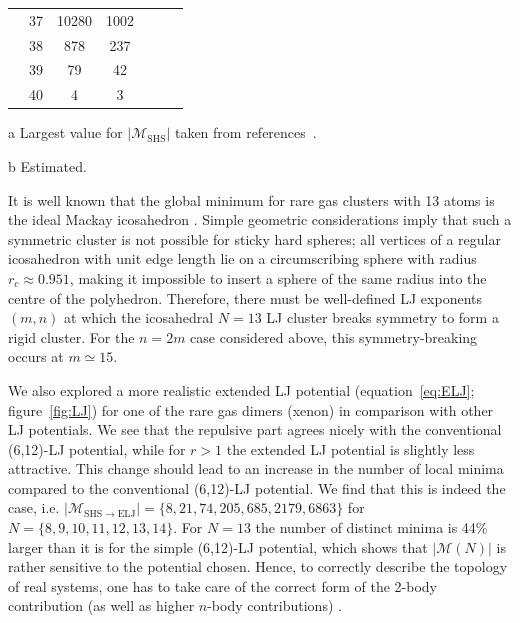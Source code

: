 \begin{table}[htbp]
{\begin{threeparttable}[para]
\begin{tabular}{clccccc}
   & 37  & 10280  				& 1002 &                       &                       &                     \\
   & 38  & 878    				& 237  &                       &                       &                     \\
   & 39  & 79     				& 42   &                       &                       &                     \\
   & 40  & 4      				& 3    &                       &                       &                     \\\bottomrule
    \end{tabular}
        \begin{tablenotes}
        \item[a]{Largest value for $|\mathcal{M}_\mathrm{SHS}|$ taken from references~\cite{Holmes-Cerfon_EnumeratingRigidSphere_2016,Hoy_Structurefinitesphere_2012,Hoy_Structuredynamicsmodel_2015}.} \item[b]{Estimated.}
        \end{tablenotes}
    \end{threeparttable}}
\end{table}%

It is well known that the global minimum for rare gas clusters with 13 atoms is
the ideal Mackay icosahedron \autocite{Hoare_Physicalclustermechanics_1975,Hoare_Statisticalmechanicsmorphology_1976,Hoare_StructureDynamicsSimple_2007}. Simple
geometric considerations imply that such a symmetric cluster is not possible
for sticky hard spheres; all vertices of a regular icosahedron with unit edge length
lie on a circumscribing sphere with radius $r_c\approx 0.951$, making it
impossible to insert a sphere of the same radius into the centre of the
polyhedron.  Therefore, there must be well-defined LJ exponents $(m,n)$ at
which the icosahedral $N = 13$ LJ cluster breaks symmetry to form a rigid cluster.  
For the $n = 2m$ case considered above, this symmetry-breaking occurs at $m \simeq 15$.

We also explored a more realistic extended LJ potential (equation~\eqref{eq:ELJ}; figure~\ref{fig:LJ})
for one of the rare gas dimers (xenon) 
in comparison with other LJ potentials. We see that the repulsive part agrees
nicely with the conventional (6,12)-LJ potential, while for $r > 1$
the extended LJ potential is slightly less attractive. 
This change should lead to an increase in the number of local minima compared to the conventional
(6,12)-LJ potential. We find that this is indeed the case, i.e.
$|\mathcal{M}_\mathrm{SHS\to ELJ}|=\{8,21,74,205,685,2179,6863\}$ for
$N=\{8,9,10,11,12,13,14\}$.  For $N=13$ the number of distinct minima is 44\% larger than it is for the simple (6,12)-LJ potential,
which shows that $|\mathcal{M}(N)|$ is rather sensitive to the potential chosen.
Hence, to correctly describe the topology of real systems, one has to take care
of the correct form of the 2-body contribution (as well as higher $n$-body
contributions) \autocite{Schwerdtfeger-2016}.



